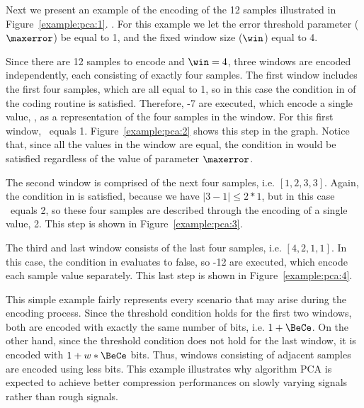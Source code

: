 Next we present an example of the encoding of the 12 samples illustrated in Figure~\ref{example:pca:1}. . For this example we let the error threshold parameter ($\maxerror$) be equal to 1, and the fixed window size ($\win$) equal to 4.


\vspace{+5pt}


Since there are 12 samples to encode and $\win=4$, three windows are encoded independently, each consisting of exactly four samples. The first window includes the first four samples, which are all equal to 1, so in this case the condition in  of the coding routine is satisfied. Therefore, -7 are executed, which encode a single value, \midrange, as a representation of the four samples in the window. For this first window, \midrange\ equals 1. Figure~\ref{example:pca:2} shows this step in the graph. Notice that, since all the values in the window are equal, the condition in  would be satisfied regardless of the value of parameter $\maxerror$.


\vspace{+5pt}


\clearpage


The second window is comprised of the next four samples, i.e. $[1, 2, 3, 3]$. Again, the condition in  is satisfied, because we have $|3 - 1| \leq 2*1$, but in this case \midrange\ equals 2, so these four samples are described through the encoding of a single value, 2. This step is shown in Figure~\ref{example:pca:3}.




The third and last window consists of the last four samples, i.e. $[4, 2, 1, 1]$. In this case, the condition in  evaluates to false, so -12 are executed, which encode each sample value separately. This last step is shown in Figure~\ref{example:pca:4}.


\vspace{+5pt}


This simple example fairly represents every scenario that may arise during the encoding process. Since the threshold condition holds for the first two windows, both are encoded with exactly the same number of bits, i.e. $1+\BeCe$. On the other hand, since the threshold condition does not hold for the last window, it is encoded with $1 + w*\BeCe$ bits. Thus, windows consisting of adjacent samples are encoded using less bits. This example illustrates why algorithm PCA is expected to achieve better compression performances on slowly varying signals rather than rough signals.


